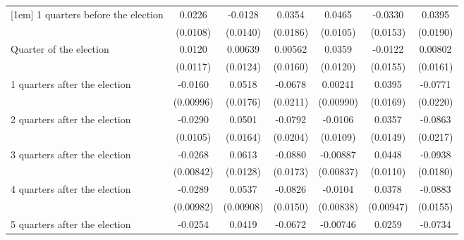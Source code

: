 \begin{table}[htbp]
\begin{tabular}{l*{6}{c}}
[1em]
 1 quarters before the election&      0.0226\sym{*}  &     -0.0128         &      0.0354         &      0.0465\sym{***}&     -0.0330\sym{*}  &      0.0395\sym{*}  \\
                    &    (0.0108)         &    (0.0140)         &    (0.0186)         &    (0.0105)         &    (0.0153)         &    (0.0190)         \\
[1em]
Quarter of the election&      0.0120         &     0.00639         &     0.00562         &      0.0359\sym{**} &     -0.0122         &     0.00802         \\
                    &    (0.0117)         &    (0.0124)         &    (0.0160)         &    (0.0120)         &    (0.0155)         &    (0.0161)         \\
[1em]
 1 quarters after the election&     -0.0160         &      0.0518\sym{**} &     -0.0678\sym{**} &     0.00241         &      0.0395\sym{*}  &     -0.0771\sym{***}\\
                    &   (0.00996)         &    (0.0176)         &    (0.0211)         &   (0.00990)         &    (0.0169)         &    (0.0220)         \\
[1em]
 2 quarters after the election&     -0.0290\sym{**} &      0.0501\sym{**} &     -0.0792\sym{***}&     -0.0106         &      0.0357\sym{*}  &     -0.0863\sym{***}\\
                    &    (0.0105)         &    (0.0164)         &    (0.0204)         &    (0.0109)         &    (0.0149)         &    (0.0217)         \\
[1em]
 3 quarters after the election&     -0.0268\sym{**} &      0.0613\sym{***}&     -0.0880\sym{***}&    -0.00887         &      0.0448\sym{***}&     -0.0938\sym{***}\\
                    &   (0.00842)         &    (0.0128)         &    (0.0173)         &   (0.00837)         &    (0.0110)         &    (0.0180)         \\
[1em]
 4 quarters after the election&     -0.0289\sym{**} &      0.0537\sym{***}&     -0.0826\sym{***}&     -0.0104         &      0.0378\sym{***}&     -0.0883\sym{***}\\
                    &   (0.00982)         &   (0.00908)         &    (0.0150)         &   (0.00838)         &   (0.00947)         &    (0.0155)         \\
[1em]
 5 quarters after the election&     -0.0254\sym{*}  &      0.0419\sym{**} &     -0.0672\sym{***}&    -0.00746         &      0.0259\sym{*}  &     -0.0734\sym{***}\\

\end{tabular}
\end{table}
